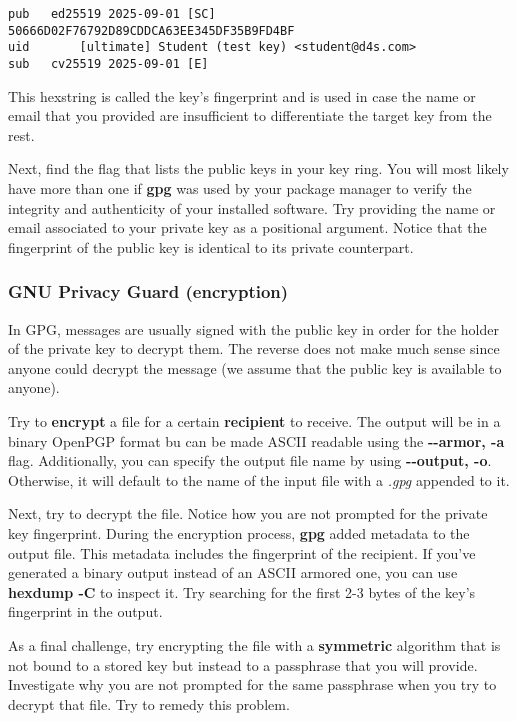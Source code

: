 \begin{lstlisting}[style=bashstyle]
pub   ed25519 2025-09-01 [SC]
50666D02F76792D89CDDCA63EE345DF35B9FD4BF
uid       [ultimate] Student (test key) <student@d4s.com>
sub   cv25519 2025-09-01 [E]
\end{lstlisting}

This hexstring is called the key's fingerprint and is used in case the name
or email that you provided are insufficient to differentiate the target key from
the rest.

Next, find the flag that lists the public keys in your key ring. You will most
likely have more than one if \textbf{gpg} was used by your package manager to
verify the integrity and authenticity of your installed software. Try providing
the name or email associated to your private key as a positional argument.
Notice that the fingerprint of the public key is identical to its private
counterpart.

\subsubsection{GNU Privacy Guard (encryption)}

In GPG, messages are usually signed with the public key in order for the holder
of the private key to decrypt them. The reverse does not make much sense since
anyone could decrypt the message (we assume that the public key is available to
anyone).

Try to \textbf{encrypt} a file for a certain \textbf{recipient} to receive. The
output will be in a binary OpenPGP format bu can be made ASCII readable using
the \textbf{-{-}armor, -a} flag. Additionally, you can specify the output file
name by using \textbf{-{-}output, -o}. Otherwise, it will default to the name of
the input file with a \textit{.gpg} appended to it.

Next, try to decrypt the file. Notice how you are not prompted for the private
key fingerprint. During the encryption process, \textbf{gpg} added metadata to
the output file. This metadata includes the fingerprint of the recipient. If
you've generated a binary output instead of an ASCII armored one, you can use
\textbf{hexdump -C} to inspect it. Try searching for the first 2-3 bytes of the
key's fingerprint in the output.

As a final challenge, try encrypting the file with a \textbf{symmetric}
algorithm that is not bound to a stored key but instead to a passphrase that you
will provide. Investigate why you are not prompted for the same passphrase when
you try to decrypt that file. Try to remedy this problem.

